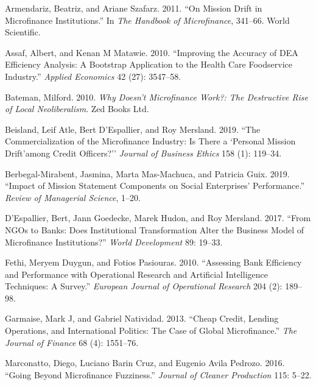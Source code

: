 \documentclass[
]{article}
\newlength{\cslhangindent}
\newlength{\cslentryspacingunit} %
\newenvironment{CSLReferences}[2] %
 {%
  \setlength{\parindent}{0pt}
  \ifodd #1
  \let\oldpar\par
  \def\par{\hangindent=\cslhangindent\oldpar}
  \fi
  \setlength{\parskip}{#2\cslentryspacingunit}
 }%
 {}
\begin{document}
\hypertarget{refs}{}
\begin{CSLReferences}{1}{0}
\leavevmode{}%
Armendariz, Beatriz, and Ariane Szafarz. 2011. {``On Mission Drift in
Microfinance Institutions.''} In \emph{The Handbook of Microfinance},
341--66. World Scientific.

\leavevmode{}%
Assaf, Albert, and Kenan M Matawie. 2010. {``Improving the Accuracy of
DEA Efficiency Analysis: A Bootstrap Application to the Health Care
Foodservice Industry.''} \emph{Applied Economics} 42 (27): 3547--58.

\leavevmode{}%
Bateman, Milford. 2010. \emph{Why Doesn't Microfinance Work?: The
Destructive Rise of Local Neoliberalism}. Zed Books Ltd.

\leavevmode{}%
Beisland, Leif Atle, Bert D'Espallier, and Roy Mersland. 2019. {``The
Commercialization of the Microfinance Industry: Is There a `Personal
Mission Drift'among Credit Officers?''} \emph{Journal of Business
Ethics} 158 (1): 119--34.

\leavevmode{}%
Berbegal-Mirabent, Jasmina, Marta Mas-Machuca, and Patricia Guix. 2019.
{``Impact of Mission Statement Components on Social Enterprises'
Performance.''} \emph{Review of Managerial Science}, 1--20.

\leavevmode{}%
D'Espallier, Bert, Jann Goedecke, Marek Hudon, and Roy Mersland. 2017.
{``From NGOs to Banks: Does Institutional Transformation Alter the
Business Model of Microfinance Institutions?''} \emph{World Development}
89: 19--33.

\leavevmode{}%
Fethi, Meryem Duygun, and Fotios Pasiouras. 2010. {``Assessing Bank
Efficiency and Performance with Operational Research and Artificial
Intelligence Techniques: A Survey.''} \emph{European Journal of
Operational Research} 204 (2): 189--98.

\leavevmode{}%
Garmaise, Mark J, and Gabriel Natividad. 2013. {``Cheap Credit, Lending
Operations, and International Politics: The Case of Global
Microfinance.''} \emph{The Journal of Finance} 68 (4): 1551--76.

\leavevmode{}%
Marconatto, Diego, Luciano Barin Cruz, and Eugenio Avila Pedrozo. 2016.
{``Going Beyond Microfinance Fuzziness.''} \emph{Journal of Cleaner
Production} 115: 5--22.


\end{CSLReferences}
\end{document}
